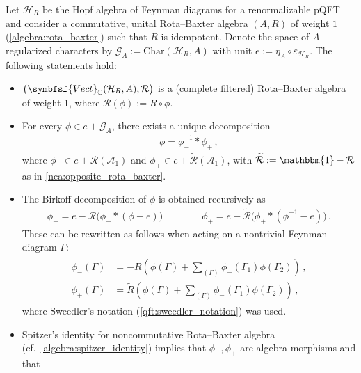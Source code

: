     \begin{theorem}
        Let $\mathcal{H}_R$ be the Hopf algebra of Feynman diagrams for a renormalizable pQFT and consider a commutative, unital Rota--Baxter algebra $(A,R)$ of weight $1$ (\cref{algebra:rota_baxter}) such that $R$ is idempotent. Denote the space of $A$-regularized characters by $\mathcal{G}_A:=\mathrm{Char}(\mathcal{H}_R,A)$ with unit $e:=\eta_A\circ\varepsilon_{\mathcal{H}_R}$. The following statements hold:
        \begin{itemize}
            \item $\bigl(\symbfsf{Vect}_{\mathbb{C}}(\mathcal{H}_R,A),\mathcal{R}\bigr)$ is a (complete filtered) Rota--Baxter algebra of weight 1, where $\mathcal{R}(\phi):=R\circ\phi$.
            \item For every $\phi\in e+\mathcal{G}_A$, there exists a unique decomposition
            \begin{gather}
                \phi = \phi_-^{-1}\ast\phi_+\,,
            \end{gather}
            where $\phi_-\in e+\mathcal{R}(\mathcal{A}_1)$ and $\phi_+\in e+\widetilde{\mathcal{R}}(\mathcal{A}_1)$, with $\widetilde{\mathcal{R}}:=\mathbbm{1}-\mathcal{R}$ as in \cref{nca:opposite_rota_baxter}.
            \item The Birkoff decomposition of $\phi$ is obtained recursively as
            \begin{gather}
                \phi_- = e - \mathcal{R}\bigl(\phi_-\ast(\phi-e)\bigr) \qquad\qquad \phi_+=e - \widetilde{\mathcal{R}}\bigl(\phi_+\ast(\phi^{-1}-e)\bigr)\,.
            \end{gather}
            These can be rewritten as follows when acting on a nontrivial Feynman diagram $\Gamma$:
            \begin{gather}
                \begin{aligned}
                    \phi_-(\Gamma) &= -R\left(\phi(\Gamma) + \sum_{(\Gamma)}\phi_-(\Gamma_1)\phi(\Gamma_2)\right)\,,\\
                    \phi_+(\Gamma) &= \widetilde{R}\left(\phi(\Gamma) + \sum_{(\Gamma)}\phi_-(\Gamma_1)\phi(\Gamma_2)\right)\,,
                \end{aligned}
            \end{gather}
            where Sweedler's notation (\cref{qft:sweedler_notation}) was used.
            \item Spitzer's identity for noncommutative Rota--Baxter algebra (cf.~\cref{algebra:spitzer_identity}) implies that $\phi_-,\phi_+$ are algebra morphisms and that

\end{itemize}
\end{theorem}
